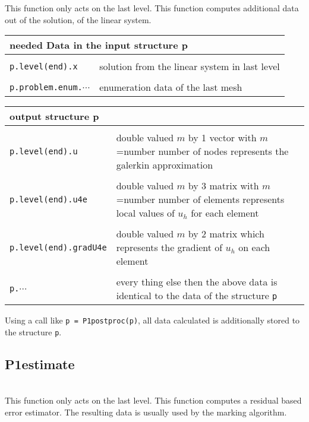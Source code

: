 \noindent This function only acts on the last level.
This function computes additional data out of the solution,
of the linear system.

\begin{longtable}[h]{p{5.5cm}p{6cm}}

\multicolumn{2}{l}{needed Data in the input structure p}\\\hline\\[-1ex]

\verb+p.level(end).x+ & solution from the linear system in last level\\
\\
\verb+p.problem.enum.+$\cdots$ & enumeration data of the last mesh
\end{longtable}

\begin{longtable}[h]{p{5.5cm}p{6cm}}

\multicolumn{2}{l}{output structure p}\\\hline\\[-1ex]

\verb+p.level(end).u+
& double valued $m$ by 1 vector with $m$=number number of nodes represents the galerkin approximation\\
\\
\verb+p.level(end).u4e+
& double valued $m$ by 3 matrix with $m$=number number of elements represents local values of $u_h$ for each element\\
\\
\verb+p.level(end).gradU4e+
& double valued $m$ by 2 matrix which represents the gradient of $u_h$ on each element\\
\\
\verb+p.+$\cdots$ & every thing else then the above data is identical to the data of the structure \verb+p+
\end{longtable}

\noindent Using a call like \verb+p = P1postproc(p)+, all data calculated is additionally stored to the structure \verb+p+.



\subsection{P1estimate}
\\

\noindent This function only acts on the last level.
This function computes a residual based error estimator.
The resulting data is usually used by the marking algorithm.

